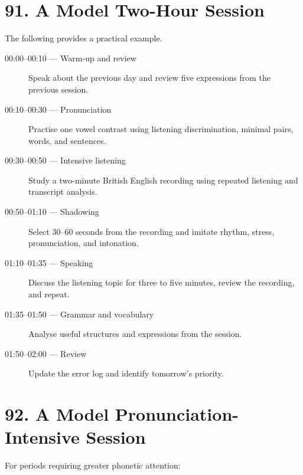 \section*{91. A Model Two-Hour Session}

The following provides a practical example.

\begin{description}

    \item[00:00--00:10 --- Warm-up and review]
    Speak about the previous day and review five expressions from the previous session.

    \item[00:10--00:30 --- Pronunciation]
    Practise one vowel contrast using listening discrimination, minimal pairs, words, and sentences.

    \item[00:30--00:50 --- Intensive listening]
    Study a two-minute British English recording using repeated listening and transcript analysis.

    \item[00:50--01:10 --- Shadowing]
    Select 30--60 seconds from the recording and imitate rhythm, stress, pronunciation, and intonation.

    \item[01:10--01:35 --- Speaking]
    Discuss the listening topic for three to five minutes, review the recording, and repeat.

    \item[01:35--01:50 --- Grammar and vocabulary]
    Analyse useful structures and expressions from the session.

    \item[01:50--02:00 --- Review]
    Update the error log and identify tomorrow's priority.

\end{description}

\section*{92. A Model Pronunciation-Intensive Session}

For periods requiring greater phonetic attention:

